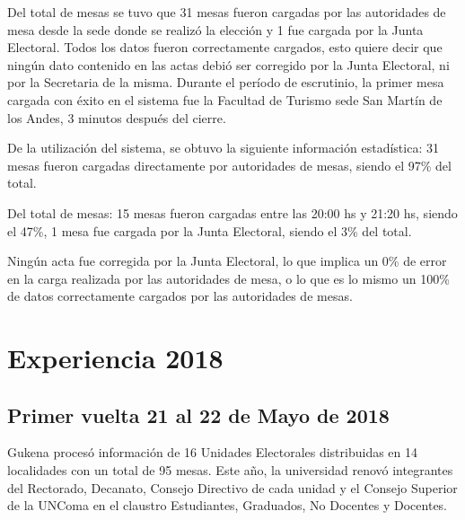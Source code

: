 Del total de mesas se tuvo que 31 mesas fueron cargadas por las autoridades de mesa desde la sede donde se realizó la elección y 1 fue cargada por la Junta Electoral. Todos los datos fueron correctamente cargados, esto quiere decir que ningún dato contenido en las actas debió ser corregido por la Junta Electoral, ni por la Secretaria de la misma.
Durante el período de escrutinio, la primer mesa cargada con éxito en el sistema fue la Facultad de Turismo sede San Martín de los Andes, 3 minutos después del cierre.

De la utilización del sistema, se obtuvo la siguiente información estadística:
31 mesas fueron cargadas directamente por autoridades de mesas, siendo el 97\% del total.

Del total de mesas:
15 mesas fueron cargadas entre las 20:00 hs y 21:20 hs, siendo el 47\%,
1 mesa fue cargada 	por la Junta Electoral, siendo el 3\% del total.

Ningún acta fue corregida por la Junta Electoral, lo que implica un 0\% de error en la carga realizada por las autoridades de mesa, o lo que es lo mismo un 100\% de datos correctamente cargados por las autoridades de mesas.

\section{Experiencia 2018}
\subsection{Primer vuelta 21 al 22 de Mayo de 2018}
Gukena procesó información de 16 Unidades Electorales distribuidas en 14 localidades con un total de 95 mesas. Este año, la universidad renovó integrantes del Rectorado, Decanato, Consejo Directivo de cada unidad y el Consejo Superior de la UNComa en el claustro Estudiantes, Graduados, No Docentes y Docentes.

